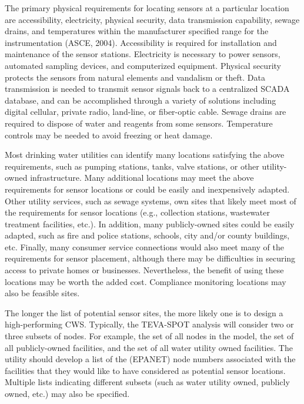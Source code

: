The primary physical requirements for locating sensors at a particular location are accessibility, electricity, physical security, data transmission capability, sewage drains, and temperatures within the manufacturer specified range for the instrumentation (ASCE, 2004). Accessibility is required for installation and maintenance of the sensor stations. Electricity is necessary to power sensors, automated sampling devices, and computerized equipment. Physical security protects the sensors from natural elements and vandalism or theft. Data transmission is needed to transmit sensor signals back to a centralized SCADA database, and can be accomplished through a variety of solutions including digital cellular, private radio, land-line, or fiber-optic cable. Sewage drains are required to dispose of water and reagents from some sensors. Temperature controls may be needed to avoid freezing or heat damage. 

Most drinking water utilities can identify many locations satisfying the above requirements, such as pumping stations, tanks, valve stations, or other utility-owned infrastructure. Many additional locations may meet the above requirements for sensor locations or could be easily and inexpensively adapted. Other utility services, such as sewage systems, own sites that likely meet most of the requirements for sensor locations (e.g., collection stations, wastewater treatment facilities, etc.). In addition, many publicly-owned sites could be easily adapted, such as fire and police stations, schools, city and/or county buildings, etc. Finally, many consumer service connections would also meet many of the requirements for sensor placement, although there may be difficulties in securing access to private homes or businesses. Nevertheless, the benefit of using these locations may be worth the added cost. Compliance monitoring locations may also be feasible sites.

The longer the list of potential sensor sites, the more likely one is to design a high-performing CWS.  Typically, the TEVA-SPOT analysis will consider two or three subsets of nodes.  For example, the set of all nodes in the model, the set of all publicly-owned facilities, and the set of all water utility owned facilities. The utility should develop a list of the (EPANET) node numbers associated with the facilities that they would like to have considered as potential sensor locations.  Multiple lists indicating different subsets (such as water utility owned, publicly owned, etc.)  may also be specified. 

